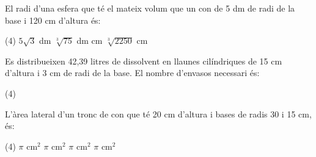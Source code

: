 \begin{autoaval}{15}
	\setcounter{myenumi}{6}
	\begin{mylist}
		
	
\exer  El radi d'una esfera que té el mateix volum que un con de 5 dm de radi de la base i 120 cm d'altura és:

\begin{tasks}(4)
	\task  $5\sqrt{3} $ dm  
	\task  $\sqrt[{3}]{75} $ dm   
	 cm   
	\task  $\sqrt[{3}]{2250} $ cm
\end{tasks}


\exer  Es distribueixen 42,39 litres de dissolvent en llaunes cilíndriques de 15 cm d'altura i 3 cm de radi de la base. El nombre d'envasos necessari és: 

\begin{tasks}(4)
\end{tasks}


\exer  L'àrea lateral d'un tronc de con que té 20 cm d'altura i bases de radis 30 i 15 cm, és:

\begin{tasks}(4)
	 $\pi$ cm${}^{2}$   
	 $\pi$ cm${}^{2}$   
	 $\pi$ cm${}^{2}$   
	 $\pi$ cm${}^{2}$ 
\end{tasks}

\end{mylist}
\end{autoaval}

